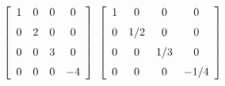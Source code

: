 {$\left[ \begin {array}{cccc} 1&0&0&0\\\noalign{\medskip}0&2&0&0
\\\noalign{\medskip}0&0&3&0\\\noalign{\medskip}0&0&0&-4
\end {array} \right] $ 
}
{$ \left[ \begin {array}{cccc} 1&0&0&0\\\noalign{\medskip}0&1/2&0&0
\\\noalign{\medskip}0&0&1/3&0\\\noalign{\medskip}0&0&0&-1/4
\end {array} \right]$}
